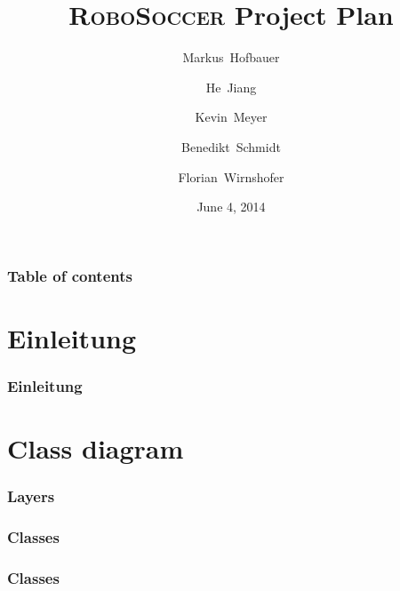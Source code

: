 \documentclass[hyperref={pdfpagelabels=false}]{beamer}
\title{\textsc{RoboSoccer} Project Plan}
\author[Hofbauer, Jiang, Meyer, Schmidt, Wirnshofer]{
  Markus~Hofbauer \and
  He~Jiang \and
  Kevin~Meyer \and
  Benedikt~Schmidt \and
  Florian~Wirnshofer
}
\institute
{
	Technische Universit\"at M\"unchen, Germany
}
\date{June 4, 2014}
\begin{document}
\begin{frame}
	\titlepage
\end{frame} 

\begin{frame}
	\frametitle{Table of contents}
	\tableofcontents
\end{frame} 

\section{Einleitung} 
\begin{frame}
	\frametitle{Einleitung} 
\end{frame}

\section{Class diagram}
\begin{frame}
	\frametitle{Layers}
	\center
	
\end{frame}

\begin{frame}
	\frametitle{Classes}
	\center
	
\end{frame}

\begin{frame}
	\frametitle{Classes}
	\center
	
\end{frame}
\end{document}
